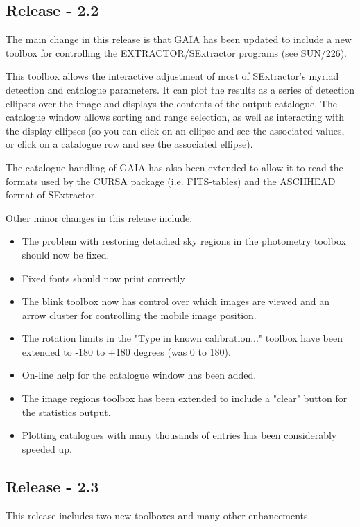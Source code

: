 \documentclass[twoside,11pt]{article}
\newcommand{\xref}[3]{#1}
\renewcommand{\_}{\texttt{\symbol{95}}}
\begin{document}
\subsection{Release - 2.2}

The main change in this release is that GAIA has been updated to
include a new toolbox for controlling the EXTRACTOR/SExtractor
programs (see \xref{SUN/226}{sun226}{}).

This toolbox allows the interactive adjustment of most of SExtractor's
myriad detection and catalogue parameters. It can plot the results as
a series of detection ellipses over the image and displays the
contents of the output catalogue. The catalogue window allows sorting
and range selection, as well as interacting with the display ellipses
(so you can click on an ellipse and see the associated values, or
click on a catalogue row and see the associated ellipse).

The catalogue handling of GAIA has also been extended to allow it to
read the formats used by the \xref{CURSA}{sun190}{} package
(i.e. FITS-tables) and the ASCII\_HEAD format of SExtractor.

Other minor changes in this release include:
\begin{itemize}
\item  The problem with restoring detached sky regions in the photometry
  toolbox should now be fixed.

\item Fixed fonts should now print correctly

\item The blink toolbox now has control over which images are viewed
  and an arrow cluster for controlling the mobile image position.

\item The rotation limits in the "Type in known calibration..."
  toolbox have been extended to -180 to +180 degrees
  (was 0 to 180).

\item On-line help for the catalogue window has been added.

\item The image regions toolbox has been extended to include a "clear"
  button for the statistics output.

\item  Plotting catalogues with many thousands of entries has been
  considerably speeded up.
\end{itemize}

\subsection{Release - 2.3}
  This release includes two new toolboxes and many other enhancements.
\end{document}
